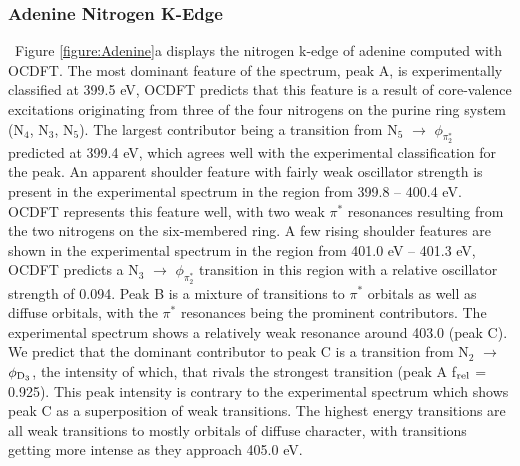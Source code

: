 \documentclass{article}
\begin{document}
\subsubsection{Adenine Nitrogen K-Edge}
   \ Figure \ref{figure:Adenine}a displays the nitrogen k-edge of adenine computed with OCDFT. The most dominant feature of the spectrum, peak A, is experimentally classified at 399.5 eV, OCDFT predicts that this feature is a result of core-valence excitations originating from three of the four nitrogens on the purine ring system (N$_4$, N$_3$, N$_5$). The largest contributor being a transition from N$_5$ $\rightarrow$ $\phi_{\pi_2^*}$ predicted at 399.4 eV, which agrees well with the experimental classification for the peak. An apparent shoulder feature with fairly weak oscillator strength is present in the experimental spectrum in the region from 399.8 -- 400.4 eV. OCDFT represents this feature well, with two weak $\pi^*$ resonances resulting from the two nitrogens on the six-membered ring. A few rising shoulder features are shown in the experimental spectrum in the region from 401.0 eV -- 401.3 eV, OCDFT predicts a N$_3$ $\rightarrow$ $\phi_{\pi_2^*}$ transition in this region with a relative oscillator strength of 0.094. Peak B is a mixture of transitions to $\pi^*$ orbitals as well as diffuse orbitals, with the $\pi^*$ resonances being the prominent contributors. 
The experimental spectrum shows a relatively weak resonance around 403.0 (peak C).  We predict that the dominant contributor to peak C is a transition from N$_2$ $\rightarrow$ $\phi_{\rm D_3}$, the intensity of which, that rivals the strongest transition (peak A f$_{\rm rel}$ = 0.925). This peak intensity is contrary to the experimental spectrum which shows peak C  as a superposition of weak transitions. The highest energy transitions are all weak transitions to mostly orbitals of diffuse character, with transitions getting more intense as they approach 405.0 eV. 
\end{document}
